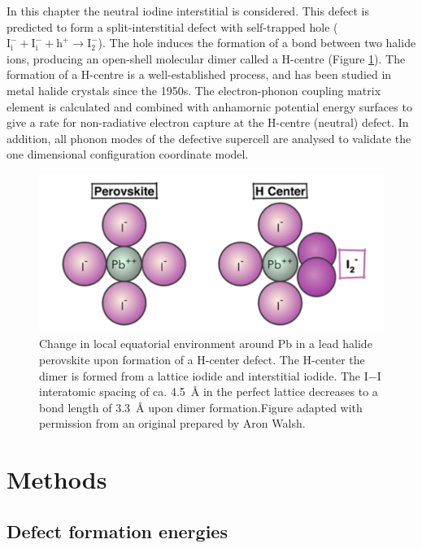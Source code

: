 In this chapter the neutral iodine interstitial is considered. This defect is predicted to form a split-interstitial defect with self-trapped hole ($\mathrm{I}_\mathrm{i}^-+\mathrm{I}_\mathrm{i}^-+\mathrm{h}^+ \rightarrow \mathrm{I}_\mathrm{2}^-$). The hole induces the formation of a bond between two halide ions, producing an open-shell molecular dimer called a H-centre (Figure \ref{Hcentre_schematic}). The formation of a H-centre is a well-established process, and has been studied in metal halide crystals since the 1950s.
The electron-phonon coupling matrix element is calculated and combined with anhamornic potential energy surfaces to give a rate for non-radiative electron capture at the H-centre (neutral) defect. In addition, all phonon modes of the defective supercell are analysed to validate the one dimensional configuration coordinate model.


\begin{figure}[h!]
\centering
  \includegraphics[width=0.7\columnwidth]{figures/ch6/Hcentre_schematic.png}
  \caption[Lattice geometry of pristine perovskite and perovskite with H-centre defect]{ Change in local equatorial environment around Pb in a lead halide perovskite upon formation of a H-center defect. The H-center the dimer is formed from a lattice iodide and interstitial iodide. The I−I interatomic spacing of ca. \SI{4.5}{\angstrom} in the perfect lattice decreases to a bond length of \SI{3.3}{\angstrom} upon dimer formation.Figure adapted with permission from an original prepared by Aron Walsh.}
\label{Hcentre_schematic}
\end{figure}


\section{Methods}

\subsection{Defect formation energies}

